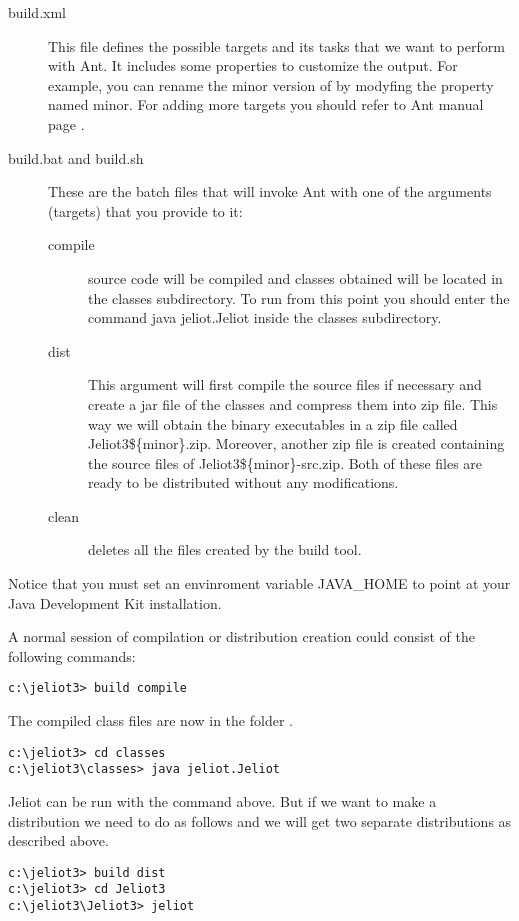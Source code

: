 \begin{description}

	\item[build.xml] This file defines the possible targets and its tasks that we want to perform with Ant. It includes some properties to customize the output. For example, you can rename the minor version of \jel{} by modyfing the property named minor. For adding more targets you should refer to Ant manual page \citep{AntManual}.

	\item[build.bat and build.sh] These are the batch files that will invoke Ant with one of the arguments (targets) that you provide to it:

	\begin{description}
	
		\item[compile] \jel{} source code will be compiled and classes obtained will be located in the classes subdirectory. To run \jel{} from this point you should enter the command java jeliot.Jeliot inside the classes subdirectory.
		
		\item[dist] This argument will first compile the source files if necessary and create a jar file of the classes and compress them into zip file. This way we will obtain the binary executables in a zip file called {Jeliot3\$\{minor\}.zip}. Moreover, another zip file is created containing the source files of \jel{} {Jeliot3\$\{minor\}-src.zip}. Both of these files are ready to be distributed without any modifications.
		\item[clean] deletes all the files created by the build tool.
	\end{description}
\end{description}

Notice that you must set an envinroment variable {JAVA\_HOME} to point at your Java Development Kit installation.

A normal session of compilation or distribution creation could consist of the following commands:

\begin{verbatim}
c:\jeliot3> build compile
\end{verbatim}
The compiled class files are now in the folder .
\begin{verbatim}
c:\jeliot3> cd classes
c:\jeliot3\classes> java jeliot.Jeliot
\end{verbatim}
Jeliot can be run with the command above. But if we want to make a
distribution we need to do as follows and we will get two separate
distributions as described above.
\begin{verbatim}
c:\jeliot3> build dist
c:\jeliot3> cd Jeliot3
c:\jeliot3\Jeliot3> jeliot
\end{verbatim}
